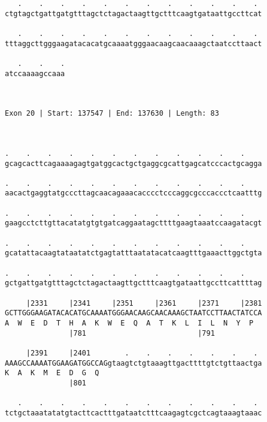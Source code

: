 \documentclass{article}
\begin{document}
\begin{Verbatim}
   .    .    .    .    .    .    .    .    .    .    .    . 
ctgtagctgattgatgtttagctctagactaagttgctttcaagtgataattgccttcat
                                                            
   .    .    .    .    .    .    .    .    .    .    .    . 
tttaggcttgggaagatacacatgcaaaatgggaacaagcaacaaagctaatccttaact
                                                            
   .    .    .
atccaaaagccaaa
              
              
 
Exon 20 | Start: 137547 | End: 137630 | Length: 83



.    .    .    .    .    .    .    .    .    .    .    .    
gcagcacttcagaaaagagtgatggcactgctgaggcgcattgagcatcccactgcagga
                                                            
.    .    .    .    .    .    .    .    .    .    .    .    
aacactgaggtatgcccttagcaacagaaacacccctcccaggcgcccaccctcaatttg
                                                            
.    .    .    .    .    .    .    .    .    .    .    .    
gaagcctcttgttacatatgtgtgatcaggaatagcttttgaagtaaatccaagatacgt
                                                            
.    .    .    .    .    .    .    .    .    .    .    .    
gcatattacaagtataatatctgagtatttaatatacatcaagtttgaaacttggctgta
                                                            
.    .    .    .    .    .    .    .    .    .    .    .    
gctgattgatgtttagctctagactaagttgctttcaagtgataattgccttcattttag
                                                            
     |2331     |2341     |2351     |2361     |2371     |2381
GCTTGGGAAGATACACATGCAAAATGGGAACAAGCAACAAAGCTAATCCTTAACTATCCA
A  W  E  D  T  H  A  K  W  E  Q  A  T  K  L  I  L  N  Y  P  
               |781                          |791           
  
     |2391     |2401        .    .    .    .    .    .    . 
AAAGCCAAAATGGAAGATGGCCAGgtaagtctgtaaagttgacttttgtctgttaactga
K  A  K  M  E  D  G  Q                                      
               |801                                         
  
   .    .    .    .    .    .    .    .    .    .    .    . 
tctgctaaatatatgtacttcactttgataatctttcaagagtcgctcagtaaagtaaac
                                                            

\end{Verbatim}
\end{document}
